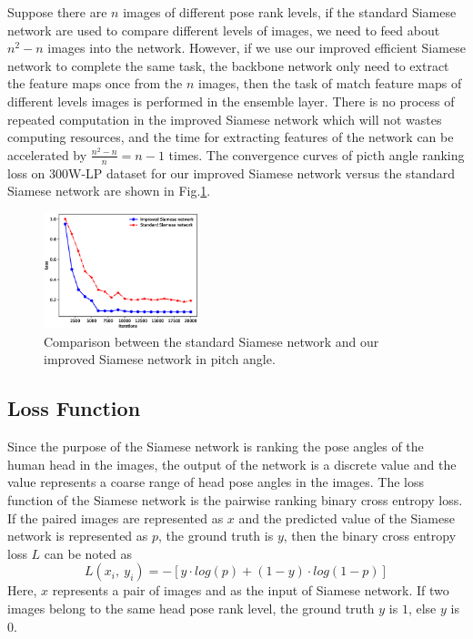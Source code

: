 \documentclass[english]{DDCLSconf}
\begin{document}
Suppose there are $n$ images of different pose rank levels, if the standard Siamese network are used to compare different levels of images, we need to feed about $n^{2}-n$ images into the network. However, if we use our improved efficient Siamese network to complete the same task, the backbone network only need to extract the feature maps once from the $n$ images, then the task of match feature maps of different levels images is performed in the ensemble layer. There is no process of repeated computation in the improved Siamese network which will not wastes computing resources, and the time for extracting features of the network can be accelerated by $\frac{n^2-n}{n}=n-1$ times. The convergence curves of picth angle ranking loss on 300W-LP dataset for our improved Siamese network versus the standard Siamese network are shown in Fig.\ref{siamese_curves}.
\begin{figure}[!htb]
	\centering
	
	\includegraphics[width=0.4\textwidth]{fig3.eps}
	
	
	\caption{Comparison between the standard Siamese network and our improved Siamese network in pitch angle.}
	
	\label{siamese_curves}       %
	
\end{figure}

\subsection{Loss Function}
Since the purpose of the Siamese network is ranking the pose angles of the human head in the images, the output of the network is a discrete value and the value represents a coarse range of head pose angles in the images. The loss function of the Siamese network is the pairwise ranking binary cross entropy loss. If the paired images are represented as $x$ and the predicted value of the Siamese network is represented as $p$, the ground truth is $y$, then the binary cross entropy loss $L$ can be noted as 
\begin{equation}
L\left ( x_i,\ y_i \right )=-\left [ y\cdot log\left ( p \right ) +\left ( 1-y \right ) \cdot log\left ( 1-p \right ) \right ]
\end{equation}
Here, $x$ represents a pair of images and as the input of Siamese network. If two images belong to the same head pose rank level, the ground truth $y$ is $1$, else $y$ is $0$.
\end{document}
